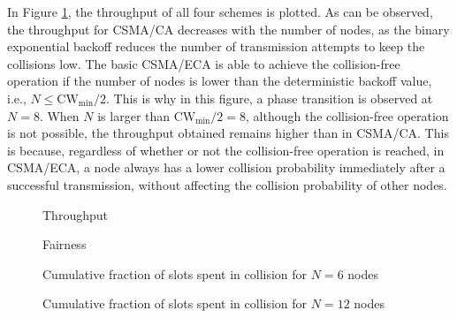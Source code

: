 \documentclass[conference]{IEEEtran}
\begin{document}

In Figure \ref{Fig:throughput}, the throughput of all four schemes is plotted. As can be observed, the throughput for CSMA/CA decreases with the number of nodes, as the binary exponential backoff reduces the number of transmission attempts to keep the collisions low. The basic CSMA/ECA is able to achieve the collision-free operation if the number of nodes is lower than the deterministic backoff value, i.e., $N\leq \text{CW}_{\min}/2$. This is why in this figure, a phase transition is observed at $N=8$. When $N$ is larger than $\text{CW}_{\min}/2=8$, although the collision-free operation is not possible, the throughput obtained remains higher than in CSMA/CA. This is because, regardless of whether or not the collision-free operation is reached, in CSMA/ECA, a node always has a lower collision probability immediately after a successful transmission, without affecting the collision probability of other nodes.

\begin{figure}[ht!!!!!!!!]
\centering
{}\label{Fig:throughput}
\caption{Throughput}
\end{figure}

\begin{figure}[ht!!!!!!!!]
\centering
{}\label{Fig:fairness}
\caption{Fairness}
\end{figure}


\begin{figure}[ht!!!!!!!!]
\centering
{}\label{Fig:Pc_6}
\caption{Cumulative fraction of slots spent in collision for $N=6$ nodes}
\end{figure}


\begin{figure}[ht!!!!!!!!]
\centering
{}\label{Fig:Pc_12}
\caption{Cumulative fraction of slots spent in collision for $N=12$ nodes}
\end{figure}
\end{document}
